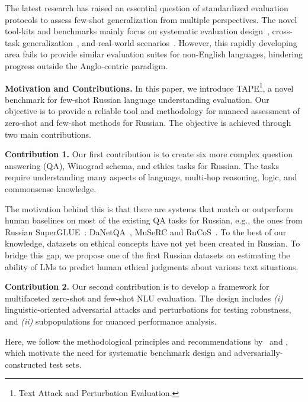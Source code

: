 \documentclass[11pt]{article}
\begin{document}
The latest research has raised an essential question of standardized evaluation protocols to assess few-shot generalization from multiple perspectives. The novel tool-kits and benchmarks mainly focus on systematic evaluation design~\cite{bragg2021flex,zheng-etal-2022-fewnlu}, cross-task generalization~\cite{ye-etal-2021-crossfit,wang2022benchmarking}, and real-world scenarios~\cite{alex2021raft}. However, this rapidly developing area fails to provide similar evaluation suites for non-English languages, hindering progress outside the Anglo-centric paradigm.

\vspace{0.2em}\noindent \textbf{Motivation and Contributions.} 
In this paper, we introduce TAPE\footnote{Text Attack and Perturbation Evaluation.}, a novel benchmark for few-shot Russian language understanding evaluation. Our objective is to provide a reliable tool and methodology for nuanced assessment of zero-shot and few-shot methods for Russian. The objective is achieved through two main contributions.

\vspace{0.2em}\noindent \textbf{Contribution 1.} Our first contribution is to create six more complex question answering (QA), Winograd schema, and ethics tasks for Russian. The tasks require understanding many aspects of language, multi-hop reasoning, logic, and commonsense knowledge. 

\vspace{0.2em} \noindent The motivation behind this is that there are systems that match or outperform human baselines on most of the existing QA tasks for Russian, e.g., the ones from Russian SuperGLUE~\cite{shavrina-etal-2020-russiansuperglue}: DaNetQA~\cite{glushkova2020danetqa}, MuSeRC and RuCoS~\cite{fenogenova-etal-2020-read}. To the best of our knowledge, datasets on ethical concepts have not yet been created in Russian. To bridge this gap, we propose one of the first Russian datasets on estimating the ability of LMs to predict human ethical judgments about various text situations.

\vspace{0.2em}
\noindent \textbf{Contribution 2.} Our second contribution is to develop a framework for multifaceted zero-shot and few-shot NLU evaluation. The design includes \emph{(i)} linguistic-oriented adversarial attacks and perturbations for testing robustness, and \emph{(ii)} subpopulations for nuanced performance analysis.

\vspace{0.2em}
\noindent Here, we follow the methodological principles and recommendations by~\citet{bowman-dahl-2021-will} and \citet{bragg2021flex}, which motivate the need for systematic benchmark design and adversarially-constructed test sets.
\end{document}
